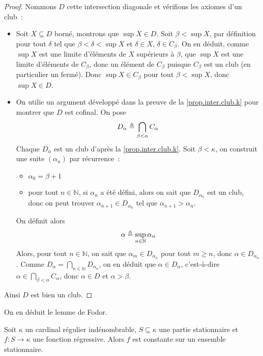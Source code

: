 \begin{proof}
  Nommons $D$ cette intersection diagonale et vérifions les axiomes d'un club~:
  \begin{itemize}
  \item Soit $X\subseteq D$ borné, montrons que $\sup X \in D$. Soit
    $\beta < \sup X$, par définition pour tout $\delta$ tel que
    $\beta<\delta<\sup X$ et $\delta \in X$, $\delta \in C_\beta$. On en déduit,
    comme $\sup X$ est une limite d'éléments de $X$ supérieurs à $\beta$,
    que $\sup X$ est une limite d'éléments de $C_\beta$, donc un élément de
    $C_\beta$ puisque $C_\beta$ est un club (en particulier un fermé). Donc
    $\sup X\in C_\beta$ pour tout $\beta < \sup X$, donc $\sup X \in D$.
  \item On utilie un argument développé dans la preuve de la
    \cref{prop.inter.club.k} pour montrer que $D$ est cofinal. On pose
    \[D_\alpha \triangleq \bigcap_{\beta < \alpha} C_\alpha\]
    Chaque $D_\alpha$ est un club d'après la \cref{prop.inter.club.k}.
    Soit $\beta < \kappa$, on construit une suite $(\alpha_n)$ par
    récurrence~:
    \begin{itemize}
    \item $\alpha_0 = \beta + 1$
    \item pour tout $n \in \mathbb N$, si $\alpha_n$ a été défini, alors on
      sait que $D_{\alpha_n}$ est un club, donc on peut trouver
      $\alpha_{n+1}\in D_{\alpha_n}$ tel que $\alpha_{n+1} > \alpha_n$.
    \end{itemize}
    On définit alors
    \[\alpha \triangleq \sup_{n \in \mathbb N} \alpha_n\]
    Alors, pour tout $n \in \mathbb N$, on sait que $\alpha_m \in D_{\alpha_n}$
    pour tout $m \geq n$, donc $\alpha \in D_{\alpha_n}$. Comme
    $\displaystyle D_{\alpha} =\bigcap_{n \in \mathbb N} D_{\alpha_n}$,
    on en déduit que $\alpha \in D_\alpha$, c'est-à-dire
    $\alpha \in \bigcap_{\beta < \alpha} C_\alpha$, donc
    $\alpha \in D$ et $\alpha > \beta$.
  \end{itemize}
  Ainsi $D$ est bien un club.
\end{proof}

On en déduit le lemme de Fodor.

\begin{lemma}[Fodor]
  Soit $\kappa$ un cardinal régulier indénombrable, $S \subseteq \kappa$ une
  partie stationnaire et $f : S \to \kappa$ une fonction régressive. Alors
  $f$ est constante sur un ensemble stationnaire.
\end{lemma}

